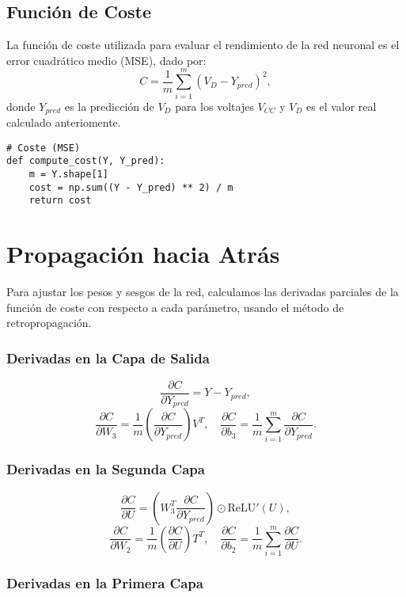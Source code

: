 \documentclass[paper=a4, fontsize=11pt]{scrartcl} %
\numberwithin{equation}{section} %
\numberwithin{figure}{section} %
\numberwithin{table}{section} %
\begin{document}
\subsection{Función de Coste}

La función de coste utilizada para evaluar el rendimiento de la red neuronal es el error cuadrático medio (MSE), dado por:
\[
C = \frac{1}{m} \sum_{i=1}^m (V_D - Y_{pred})^2,
\]
donde $Y_{pred}$ es la predicción de $V_D$ para los voltajes $V_{CC}$ y $V_D$ es el valor real calculado anteriomente.

\vspace{2mm}
\begin{lstlisting}
# Coste (MSE)
def compute_cost(Y, Y_pred):
    m = Y.shape[1]
    cost = np.sum((Y - Y_pred) ** 2) / m
    return cost
\end{lstlisting}

\section{Propagación hacia Atrás}

Para ajustar los pesos y sesgos de la red, calculamos las derivadas parciales de la función de coste con respecto a cada parámetro, usando el método de retropropagación.

\subsubsection{Derivadas en la Capa de Salida}

\[
\frac{\partial C}{\partial Y_{pred}} = Y - Y_{pred},
\]
\[
\frac{\partial C}{\partial W_3} = \frac{1}{m} \left( \frac{\partial C}{\partial Y_{pred}} \right) V^T, \quad \frac{\partial C}{\partial b_3} = \frac{1}{m} \sum_{i=1}^m \frac{\partial C}{\partial Y_{pred}}.
\]

\subsubsection{Derivadas en la Segunda Capa}

\[
\frac{\partial C}{\partial U} = \left( W_3^T \frac{\partial C}{\partial Y_{pred}} \right) \odot \text{ReLU}'(U),
\]
\[
\frac{\partial C}{\partial W_2} = \frac{1}{m} \left( \frac{\partial C}{\partial U} \right) T^T, \quad \frac{\partial C}{\partial b_2} = \frac{1}{m} \sum_{i=1}^m \frac{\partial C}{\partial U}.
\]

\subsubsection{Derivadas en la Primera Capa}
\end{document}
